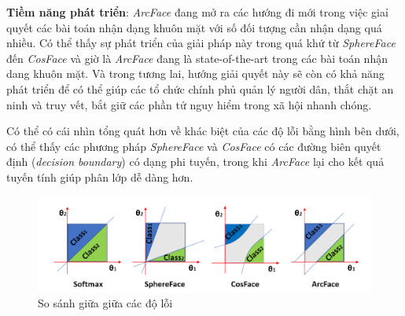 \textbf{Tiềm năng phát triển}: \textit{ArcFace} đang mở ra các hướng đi mới trong việc giaỉ quyết các bài toán nhận dạng khuôn mặt với số đối tượng cần nhận dạng quá nhiều. Có thể thấy sự phát triển của giải pháp này trong quá khứ từ \textit{SphereFace} đến \textit{CosFace} và giờ là \textit{ArcFace} đang là state-of-the-art trong các bài toán nhận dang khuôn mặt. Và trong tương lai, hướng giải quyết này sẽ còn có khả năng phát triển để có thể giúp các tổ chức chính phủ quản lý người dân, thắt chặt an ninh và truy vết, bắt giữ các phần tử nguy hiểm trong xã hội nhanh chóng.

Có thể có cái nhìn tổng quát hơn về khác biệt của các độ lỗi bằng hình bên dưới, có thể thấy các phương pháp \textit{SphereFace} và \textit{CosFace} có các đường biên quyết định (\textit{decision boundary}) có dạng phi tuyến, trong khi \textit{ArcFace} lại cho kết quả tuyến tính giúp phân lớp dễ dàng hơn.  

\begin{figure}[H]
    \begin{center}
        \includegraphics[scale=0.7]{images/ex2/loss-cmp}
        \caption{So sánh giữa giữa các độ lỗi}
    \end{center}
\end{figure}


